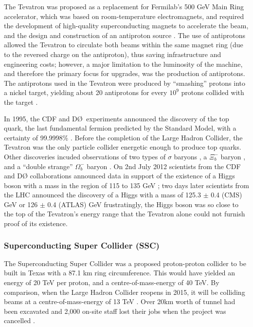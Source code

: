 The Tevatron was proposed as a replacement for Fermilab's 500 GeV Main Ring accelerator, which was based on room-temperature electromagnets, and required the development of high-quality superconducting magnets to accelerate the beam, and the design and construction of an antiproton source \cite{Tevatron:Retrospective:Online}. The use of antiprotons allowed the Tevatron to circulate both beams within the same magnet ring (due to the reversed charge on the antiproton), thus saving infrastructure and engineering costs; however, a major limitation to the luminosity of the machine, and therefore the primary focus for upgrades, was the production of antiprotons. The antiprotons used in the Tevatron were produced by ``smashing'' protons into a nickel target, yielding about 20 antiprotons for every $10^{9}$ protons collided with the target \cite{Tevatron:Antiprotons:Online}.

In 1995, the CDF and D\O$\:$ experiments announced the discovery of the top quark, the last fundamental fermion predicted by the Standard Model, with a certainty of 99.9998\% \cite{PhysRevLett:Top1,PhysRevLett:Top2}. Before the completion of the Large Hadron Collider, the Tevatron was the only particle collider energetic enough to produce top quarks. Other discoveries incuded observations of two types of $\sigma$ baryons \cite{Fermi:Sigma:Online}, a $\Xi_{b}^{-}$ baryon \cite{Fermi:Xi:Online}, and a ``double strange'' $\Omega_{b}^{-}$ baryon \cite{PhysRevLett:Omega}. On 2nd July 2012 scientists from the CDF and D\O\: collaborations announced data in support of the existence of a Higgs boson with a mass in the region of 115 to 135 GeV \cite{Fermi:Higgs:Online}; two days later scientists from the LHC announced the discovery of a Higgs with a mass of 125.3 $\pm$ 0.4 (CMS) GeV \cite{PhysLettB:Higgs:CMS} or 126 $\pm$ 0.4 (ATLAS) GeV \cite{PhysLettB:Higgs:ATLAS} \textendash frustratingly, the Higgs boson was so close to the top of the Tevatron's energy range that the Tevatron alone could not furnish proof of its existence.

\subsubsection{Superconducting Super Collider (SSC)}
The Superconducting Super Collider was a proposed proton-proton \cite{SSC:LAT:Online} collider to be built in Texas with a 87.1 km ring circumference. This would have yielded an energy of 20 TeV per proton, and a centre-of-mass-energy of 40 TeV. By comparison, when the Large Hadron Collider reopens in 2015, it will be colliding beams at a centre-of-mass-energy of 13 TeV \cite{LHC:14TeV:Online}. Over 20km worth of tunnel had been excavated and 2,000 on-site staff lost their jobs when the project was cancelled \cite{SSC:Sun:Online}.


